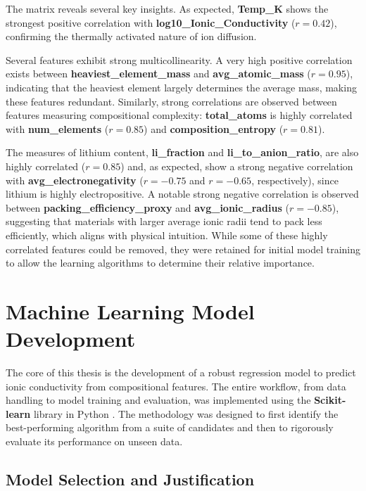 The matrix reveals several key insights. As expected, \textbf{Temp\_K} shows the strongest positive correlation with \textbf{log10\_Ionic\_Conductivity} (\(r = 0.42\)), confirming the thermally activated nature of ion diffusion.

Several features exhibit strong multicollinearity. A very high positive correlation exists between \textbf{heaviest\_element\_mass} and \textbf{avg\_atomic\_mass} (\(r = 0.95\)), indicating that the heaviest element largely determines the average mass, making these features redundant. Similarly, strong correlations are observed between features measuring compositional complexity: \textbf{total\_atoms} is highly correlated with \textbf{num\_elements} (\(r = 0.85\)) and \textbf{composition\_entropy} (\(r = 0.81\)).

The measures of lithium content, \textbf{li\_fraction} and \textbf{li\_to\_anion\_ratio}, are also highly correlated (\(r = 0.85\)) and, as expected, show a strong negative correlation with \textbf{avg\_electronegativity} (\(r = -0.75\) and \(r = -0.65\), respectively), since lithium is highly electropositive. A notable strong negative correlation is observed between \textbf{packing\_efficiency\_proxy} and \textbf{avg\_ionic\_radius} (\(r = -0.85\)), suggesting that materials with larger average ionic radii tend to pack less efficiently, which aligns with physical intuition. While some of these highly correlated features could be removed, they were retained for initial model training to allow the learning algorithms to determine their relative importance.

\section{Machine Learning Model Development}

The core of this thesis is the development of a robust regression model to predict ionic conductivity from compositional features. The entire workflow, from data handling to model training and evaluation, was implemented using the \textbf{Scikit-learn} library in Python \cite{Scikit-learn}. The methodology was designed to first identify the best-performing algorithm from a suite of candidates and then to rigorously evaluate its performance on unseen data.

\subsection{Model Selection and Justification}

